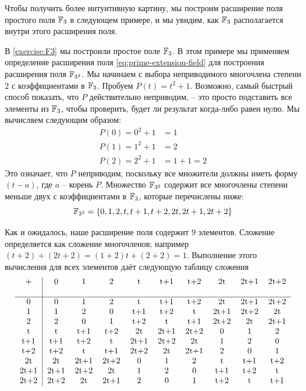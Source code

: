 Чтобы получить более интуитивную картину, мы построим расширение поля простого поля $\mathbb{F}_3$ в следующем примере, и мы увидим, как $\mathbb{F}_3$ располагается внутри этого расширения поля.
\begin{example}
\label{finite_field_F3_2}
В \exercisename{} \ref{exercise:F3} мы построили простое поле $\mathbb{F}_3$. В этом примере мы применяем определение расширения поля \eqref{eq:prime-extension-field} для построения расширения поля $\mathbb{F}_{3^2}$. Мы начинаем с выбора неприводимого многочлена степени $2$ с коэффициентами в $\mathbb{F}_3$. Пробуем
$P(t)=t^2+1$. Возможно, самый быстрый способ показать, что $P$ действительно неприводим, -- это просто подставить все элементы из $\mathbb{F}_3$, чтобы проверить, будет ли результат когда-либо равен нулю. Мы вычисляем следующим образом:
\begin{align*}
P(0) = 0^2+1 &= 1\\
P(1) = 1^2+1 &= 2\\
P(2) = 2^2+1 &=  1+1  = 2
\end{align*}
Это означает, что $P$ неприводим, поскольку все множители должны иметь форму $(t-a)$, где $a$ -- корень $P$. Множество $\mathbb{F}_{3^2}$ содержит все многочлены степени меньше двух с коэффициентами в $\mathbb{F}_3$, которые перечислены ниже:
\begin{equation}
\mathbb{F}_{3^2}=\{0,1,2,t,t+1,t+2,2t,2t+1,2t+2\}
\end{equation}

Как и ожидалось, наше расширение поля содержит $9$ элементов. Сложение определяется как сложение многочленов; например $(t+2) + (2t+2)= (1+2)t +(2+2)= 1$. Выполнение этого вычисления для всех элементов даёт следующую таблицу сложения
\begin{equation}\label{F32-add-table}
  \begin{tabular}{c | c c c c c c c c c}
    + & 0    & 1    & 2    & t    & t+1  & t+2  & 2t   & 2t+1 & 2t+2 \\\\\hline
    0 & 0    & 1    & 2    & t    & t+1  & t+2  & 2t   & 2t+1 & 2t+2 \\
    1 & 1    & 2    & 0    & t+1  & t+2  & t    & 2t+1 & 2t+2 & 2t   \\
    2 & 2    & 0    & 1    & t+2  & t    & t+1  & 2t+2 & 2t   & 2t+1 \\
    t & t    & t+1  & t+2  & 2t   & 2t+1 & 2t+2 & 0    & 1    & 2    \\
  t+1 & t+1  & t+2  & t    & 2t+1 & 2t+2 & 2t   & 1    & 2    & 0    \\
  t+2 & t+2  & t    & t+1  & 2t+2 & 2t   & 2t+1 & 2    & 0    & 1    \\
   2t & 2t   & 2t+1 & 2t+2 & 0    & 1    & 2    & t    & t+1  & t+2  \\
 2t+1 & 2t+1 & 2t+2 & 2t   & 1    & 2    & 0    & t+1  & t+2  & t    \\
 2t+2 & 2t+2 & 2t   & 2t+1 & 2    & 0    & 1    & t+2  & t    & t+1
  \end{tabular}
\end{equation}


\end{example}
